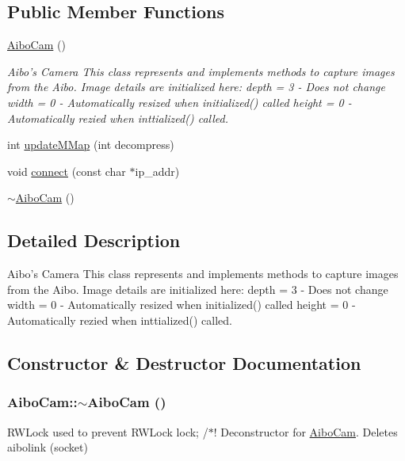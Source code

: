 \subsection*{Public Member Functions}
\begin{DoxyCompactItemize}
\item 
\hypertarget{classAiboCam_a594411a1df57552aa2b9c609319c74d4}{
\hyperlink{classAiboCam_a594411a1df57552aa2b9c609319c74d4}{AiboCam} ()}
\label{classAiboCam_a594411a1df57552aa2b9c609319c74d4}

\begin{DoxyCompactList}\small\item\em Aibo's Camera This class represents and implements methods to capture images from the Aibo. Image details are initialized here: depth = 3 -\/ Does not change width = 0 -\/ Automatically resized when initialized() called height = 0 -\/ Automatically rezied when inttialized() called. \item\end{DoxyCompactList}\item 
int \hyperlink{classAiboCam_a72162af9d25b9b24d6449d41b234f8b2}{updateMMap} (int decompress)
\item 
void \hyperlink{classAiboCam_aa450f46c7d0bfc09ec6f6b16cb42fdc6}{connect} (const char $\ast$ip\_\-addr)
\item 
\hyperlink{classAiboCam_aeef7ebf6fe97788c0672481399586295}{$\sim$AiboCam} ()
\end{DoxyCompactItemize}


\subsection{Detailed Description}
Aibo's Camera This class represents and implements methods to capture images from the Aibo. Image details are initialized here: depth = 3 -\/ Does not change width = 0 -\/ Automatically resized when initialized() called height = 0 -\/ Automatically rezied when inttialized() called. 

\subsection{Constructor \& Destructor Documentation}
\hypertarget{classAiboCam_aeef7ebf6fe97788c0672481399586295}{
\subsubsection[{$\sim$AiboCam}]{\setlength{\rightskip}{0pt plus 5cm}AiboCam::$\sim$AiboCam ()}}
\label{classAiboCam_aeef7ebf6fe97788c0672481399586295}
RWLock used to prevent RWLock lock; /$\ast$! Deconstructor for \hyperlink{classAiboCam}{AiboCam}. Deletes aibolink (socket)

